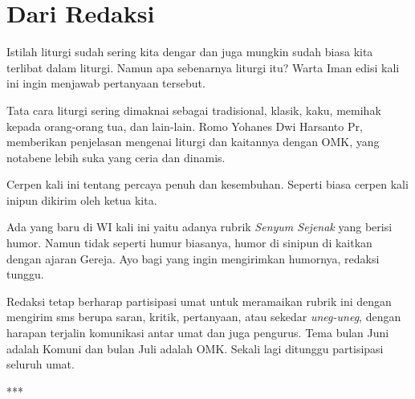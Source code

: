 \newpage

\chapter*{Dari Redaksi}
\footnotesize
{}
Istilah liturgi sudah sering kita dengar dan juga mungkin sudah biasa kita terlibat dalam liturgi. Namun apa sebenarnya liturgi itu? Warta Iman edisi kali ini ingin menjawab pertanyaan tersebut.

\bigskip
Tata cara liturgi sering dimaknai sebagai tradisional, klasik, kaku, memihak kepada orang-orang tua, dan lain-lain. Romo Yohanes Dwi Harsanto Pr, memberikan penjelasan mengenai liturgi dan kaitannya dengan OMK, yang notabene lebih suka yang ceria dan dinamis.  

\bigskip
Cerpen kali ini tentang percaya penuh dan kesembuhan. Seperti biasa cerpen kali inipun dikirim oleh ketua kita.

\bigskip
Ada yang baru di WI kali ini yaitu adanya rubrik \textit{Senyum Sejenak} yang berisi humor. Namun tidak seperti humur biasanya, humor di sinipun di kaitkan dengan ajaran Gereja. Ayo bagi yang ingin mengirimkan humornya, redaksi tunggu.

\bigskip
Redaksi tetap berharap partisipasi umat untuk meramaikan rubrik ini dengan mengirim sms berupa saran, kritik, pertanyaan, atau sekedar \textit{uneg-uneg}, dengan harapan terjalin komunikasi antar umat dan juga pengurus. Tema bulan Juni adalah Komuni dan bulan Juli adalah OMK. Sekali lagi ditunggu partisipasi seluruh umat.
\normalsize

\begin{center}***\end{center} 

\vfill

\normalsize

